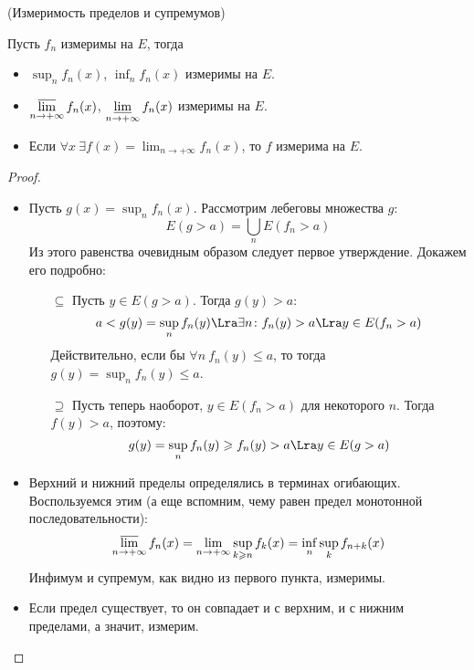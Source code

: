 \begin{theorem}(Измеримость пределов и супремумов)

	Пусть $f_n$ измеримы на $E$, тогда
	\begin{itemize}
		\item $\displaystyle \sup_{n}{f_n(x)}$, $\displaystyle \inf_{n}{f_n(x)}$
			измеримы на $E$.
		\item $\displaystyle \varlimsup_{n \to +\infty}{f_n(x)}$, 
			$\displaystyle \varliminf_{n \to +\infty}{f_n(x)}$ измеримы на $E$.
		\item Если $\displaystyle \forall x~ \exists f(x) =
			\lim_{n \to +\infty}{f_n(x)}$, то $f$ измерима на $E$.
	\end{itemize}
\end{theorem}
\begin{proof}
	\enewline
	\begin{itemize}
		\item Пусть $\displaystyle g(x) = \sup_{n}{f_n(x)}$. Рассмотрим лебеговы 
			множества $g$:
\[
	E(g > a) = \bigcup_{n}{E(f_n > a)}
\]
	Из этого равенства очевидным образом следует первое утверждение.
	Докажем его подробно:
		\begin{itemize}
			\item[$\subseteq$]
				Пусть $y \in E(g > a)$. Тогда $g(y) > a$:
\[
	a < g(y) = \sup_{n}{f_n(y)} \Lra \exists n\colon f_n(y) > a \Lra
	y \in E(f_n > a)	
\]
				Действительно, если бы $\forall n~ f_n(y) \leqslant a$, то 
				тогда $\displaystyle g(y) = \sup_{n}{f_n(y)} \leqslant a$.
			\item[$\supseteq$]
				Пусть теперь наоборот, $y \in E(f_n > a)$ для некоторого $n$.
				Тогда $f(y) > a$, поэтому:
\[
	g(y) = \sup_{n}{f_n(y)} \geqslant f_n(y) > a \Lra y \in E(g > a)
\]
		\end{itemize}	
		\item Верхний и нижний пределы определялись в терминах огибающих. 
			Воспользуемся этим (а еще вспомним, чему равен предел 
			монотонной последовательности):
\[
	\varlimsup_{n \to +\infty}{f_n(x)} = \lim_{n \to +\infty}{\sup_{k \geqslant n}
	{f_k(x)}} = \inf_{n}{\sup_{k}{f_{n + k}(x)}}
\]
			Инфимум и супремум, как видно из первого пункта, измеримы.
		\item Если предел существует, то он совпадает и с верхним, и с нижним
			пределами, а значит, измерим.
	\end{itemize}
\end{proof}

